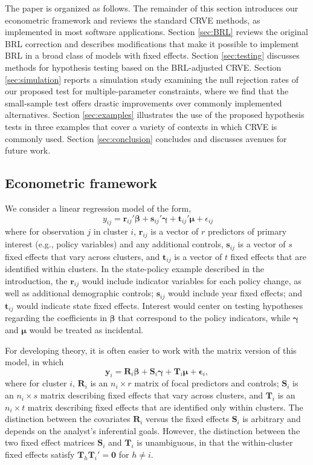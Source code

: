 \documentclass[draft]{ectaart}\usepackage[]{graphicx}\usepackage[]{color}
\newcommand{\bm}{\mathbf}
\newcommand{\bs}{\boldsymbol}
\begin{document}
The paper is organized as follows. The remainder of this section introduces our econometric framework and reviews the standard CRVE methods, as implemented in most software applications.
Section \ref{sec:BRL} reviews the original BRL correction and describes modifications that make it possible to implement BRL in a broad class of models with fixed effects.
Section \ref{sec:testing} discusses methods for hypothesis testing based on the BRL-adjusted CRVE. 
Section \ref{sec:simulation} reports a simulation study examining the null rejection rates of our proposed test for multiple-parameter constraints, where we find that the small-sample test offers drastic improvements over commonly implemented alternatives. 
Section \ref{sec:examples} illustrates the use of the proposed hypothesis tests in three examples that cover a variety of contexts in which CRVE is commonly used. 
Section \ref{sec:conclusion} concludes and discusses avenues for future work. 

\subsection{Econometric framework}

We consider a linear regression model of the form,
\begin{equation}
\label{eq:fixed_effects_ij}
\ {y}_{ij} = \bm{r}_{ij}' \bs\beta + \bm{s}_{ij}' \bs\gamma + \bm{t}_{ij}' \bs\mu + \epsilon_{ij} 
\end{equation}
where for observation $j$ in cluster $i$, $\bm{r}_{ij}$ is a vector of $r$ predictors of primary interest (e.g., policy variables) and any additional controls, $\bm{s}_{ij}$ is a vector of $s$ fixed effects that vary across clusters, and $\bm{t}_{ij}$ is a vector of $t$ fixed effects that are identified within clusters. In the state-policy example described in the introduction, the $\bm{r}_{ij}$ would include indicator variables for each policy change, as well as additional demographic controls; $\bm{s}_{ij}$ would include year fixed effects; and $\bm{t}_{ij}$ would indicate state fixed effects. Interest would center on testing hypotheses regarding the coefficients in $\bs\beta$ that correspond to the policy indicators, while $\bs\gamma$ and $\bs\mu$ would be treated as incidental. 

For developing theory, it is often easier to work with the matrix version of this model, in which
\begin{equation}
\label{eq:fixed_effects}
\bm{y}_i = \bm{R}_i \bs\beta + \bm{S}_i \bs\gamma + \bm{T}_i \bs\mu + \bs\epsilon_i,
\end{equation}
where for cluster $i$, $\bm{R}_i$ is an $n_i \times r$ matrix of focal predictors and controls; $\bm{S}_i$ is an $n_i \times s$ matrix describing fixed effects that vary across clusters, and $\bm{T}_i$ is an $n_i \times t$ matrix describing fixed effects that are identified only within clusters. The distinction between the covariates $\bm{R}_i$ versus the fixed effects $\bm{S}_i$ is arbitrary and depends on the analyst's inferential goals. However, the distinction between the two fixed effect matrices $\bm{S}_i$ and $\bm{T}_i$ is unambiguous, in that the within-cluster fixed effects satisfy $\bm{T}_h \bm{T}_i' = \bm{0}$ for $h \neq i$. 
\end{document}

